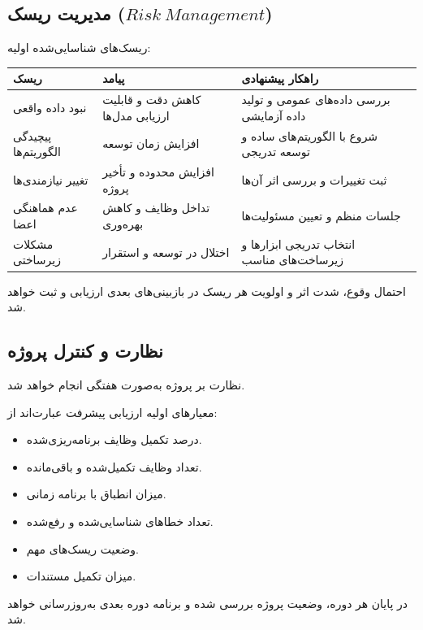 \documentclass[12pt,a4paper]{article}
\begin{document}
	\subsection{مدیریت ریسک ($Risk\ Management$)}
	
	ریسک‌های شناسایی‌شده اولیه:
	
	\begin{longtable}{|p{3.3cm}|p{4cm}|p{5.7cm}|}
		\hline
		\textbf{ریسک} & \textbf{پیامد} & \textbf{راهکار پیشنهادی} \\
		\hline
		نبود داده واقعی &
		کاهش دقت و قابلیت ارزیابی مدل‌ها &
		بررسی داده‌های عمومی و تولید داده آزمایشی \\
		\hline
		پیچیدگی الگوریتم‌ها &
		افزایش زمان توسعه &
		شروع با الگوریتم‌های ساده و توسعه تدریجی \\
		\hline
		تغییر نیازمندی‌ها &
		افزایش محدوده و تأخیر پروژه &
		ثبت تغییرات و بررسی اثر آن‌ها \\
		\hline
		عدم هماهنگی اعضا &
		تداخل وظایف و کاهش بهره‌وری &
		جلسات منظم و تعیین مسئولیت‌ها \\
		\hline
		مشکلات زیرساختی &
		اختلال در توسعه و استقرار &
		انتخاب تدریجی ابزارها و زیرساخت‌های مناسب \\
		\hline
	\end{longtable}
	
	احتمال وقوع، شدت اثر و اولویت هر ریسک
	در بازبینی‌های بعدی ارزیابی و ثبت خواهد شد.
	
	\subsection{نظارت و کنترل پروژه}
	
	نظارت بر پروژه به‌صورت هفتگی انجام خواهد شد.
	
	معیارهای اولیه ارزیابی پیشرفت عبارت‌اند از:
	
	\begin{itemize}
		\item درصد تکمیل وظایف برنامه‌ریزی‌شده.
		\item تعداد وظایف تکمیل‌شده و باقی‌مانده.
		\item میزان انطباق با برنامه زمانی.
		\item تعداد خطاهای شناسایی‌شده و رفع‌شده.
		\item وضعیت ریسک‌های مهم.
		\item میزان تکمیل مستندات.
	\end{itemize}
	
	در پایان هر دوره، وضعیت پروژه بررسی شده
	و برنامه دوره بعدی به‌روزرسانی خواهد شد.
	
\end{document}
